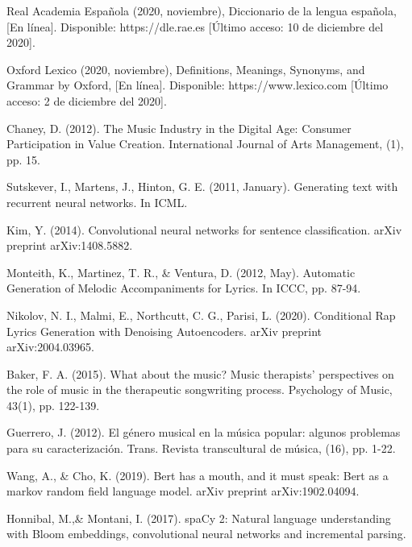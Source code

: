 \documentclass[12pt, a4paper, titlepage]{report}
\begin{document}
\begin{thebibliography}{20}
	Real Academia Española (2020, noviembre), Diccionario de la lengua española, [En línea]. Disponible: https://dle.rae.es [Último acceso: 10 de diciembre del 2020].
	
	Oxford Lexico (2020, noviembre), Definitions, Meanings, Synonyms, and Grammar by Oxford, [En línea]. Disponible: https://www.lexico.com [Último acceso: 2 de diciembre del 2020].
	
	Chaney, D. (2012). The Music Industry in the Digital Age: Consumer Participation in Value Creation. International Journal of Arts Management, (1), pp. 15.
	
	Sutskever, I., Martens, J., Hinton, G. E. (2011, January). Generating text with recurrent neural networks. In ICML.
	
	Kim, Y. (2014). Convolutional neural networks for sentence classification. arXiv preprint arXiv:1408.5882.
	
	Monteith, K., Martinez, T. R., \& Ventura, D. (2012, May). Automatic Generation of Melodic Accompaniments for Lyrics. In ICCC, pp. 87-94.
	
	Nikolov, N. I., Malmi, E., Northcutt, C. G., Parisi, L. (2020). Conditional Rap Lyrics Generation with Denoising Autoencoders. arXiv preprint arXiv:2004.03965.
	
	Baker, F. A. (2015). What about the music? Music therapists’ perspectives on the role of music in the therapeutic songwriting process. Psychology of Music, 43(1), pp. 122-139.
	
	Guerrero, J. (2012). El género musical en la música popular: algunos problemas para su caracterización. Trans. Revista transcultural de música, (16), pp. 1-22.
	
	Wang, A., \& Cho, K. (2019). Bert has a mouth, and it must speak: Bert as a markov random field language model. arXiv preprint arXiv:1902.04094.
	
	Honnibal, M.,\& Montani, I. (2017). spaCy 2: Natural language understanding with Bloom embeddings, convolutional neural networks and incremental parsing.
	

\end{thebibliography}
\end{document}
